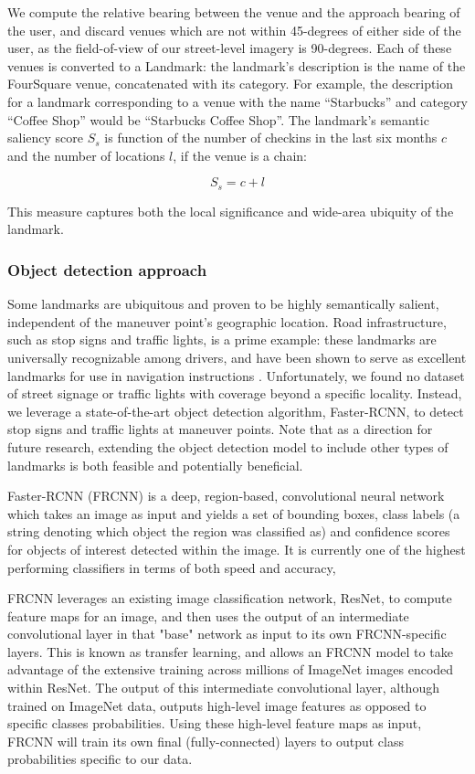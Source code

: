 We compute the relative bearing between the venue and the approach bearing of the user, and discard venues which are not within 45-degrees of either side of the user, as the field-of-view of our street-level imagery is 90-degrees.
Each of these venues is converted to a Landmark: the landmark's description is the name of the FourSquare venue, concatenated with its category. For example, the description for a landmark corresponding to a venue with the name “Starbucks” and category “Coffee Shop” would be “Starbucks Coffee Shop”. The landmark’s semantic saliency score $S_s$ is function of the number of checkins in the last six months $c$ and the number of locations $l$, if the venue is a chain:

\begin{equation}
    S_s = c + l
\end{equation}

This measure captures both the local significance and wide-area ubiquity of the landmark.

\subsubsection{Object detection approach}
Some landmarks are ubiquitous and proven to be highly semantically salient, independent of the maneuver point's geographic location. Road infrastructure, such as stop signs and traffic lights, is a prime example: these landmarks are universally recognizable among drivers, and have been shown to serve as excellent landmarks for use in navigation instructions \cite{may_ross_bayer_2005}. Unfortunately, we found no dataset of street signage or traffic lights with coverage beyond a specific locality. Instead, we leverage a state-of-the-art object detection algorithm, Faster-RCNN, to detect stop signs and traffic lights at maneuver points. Note that as a direction for future research, extending the object detection model to include other types of landmarks is both feasible and potentially beneficial.

Faster-RCNN (FRCNN) \cite{ren2015faster} is a deep, region-based, convolutional neural network which takes an image as input and yields a set of bounding boxes, class labels (a string denoting which object the region was classified as) and confidence scores for objects of interest detected within the image. It is currently one of the highest performing classifiers in terms of both speed and accuracy, 

FRCNN leverages an existing image classification network, ResNet, to compute feature maps for an image, and then uses the output of an intermediate convolutional layer in that "base" network as input to its own FRCNN-specific layers. This is known as transfer learning, and allows an FRCNN model to take advantage of the extensive training across millions of ImageNet images encoded within ResNet. The output of this intermediate convolutional layer, although trained on ImageNet data, outputs high-level image features as opposed to specific classes probabilities. Using these high-level feature maps as input, FRCNN will train its own final (fully-connected) layers to output class probabilities specific to our data.

